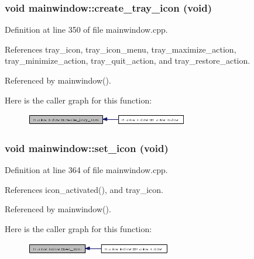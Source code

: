 \subsubsection{\setlength{\rightskip}{0pt plus 5cm}void mainwindow::create\_\-tray\_\-icon (void)\hspace{0.3cm}{\tt  [private]}}\label{classmainwindow_e8ef2197826595169fbebe9622afa8ec}




Definition at line 350 of file mainwindow.cpp.

References tray\_\-icon, tray\_\-icon\_\-menu, tray\_\-maximize\_\-action, tray\_\-minimize\_\-action, tray\_\-quit\_\-action, and tray\_\-restore\_\-action.

Referenced by mainwindow().

Here is the caller graph for this function:\begin{figure}[H]
\begin{center}
\leavevmode
\includegraphics[width=201pt]{classmainwindow_e8ef2197826595169fbebe9622afa8ec_icgraph}
\end{center}
\end{figure}
\subsubsection{\setlength{\rightskip}{0pt plus 5cm}void mainwindow::set\_\-icon (void)\hspace{0.3cm}{\tt  [private]}}\label{classmainwindow_3b071c89ed28b35cbaa1dc815c4a836a}




Definition at line 364 of file mainwindow.cpp.

References icon\_\-activated(), and tray\_\-icon.

Referenced by mainwindow().

Here is the caller graph for this function:\begin{figure}[H]
\begin{center}
\leavevmode
\includegraphics[width=180pt]{classmainwindow_3b071c89ed28b35cbaa1dc815c4a836a_icgraph}
\end{center}
\end{figure}
